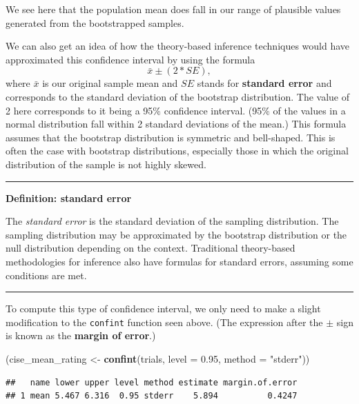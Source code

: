 \documentclass[]{tufte-book}
\newenvironment{Shaded}{\begin{snugshade}}{\end{snugshade}}
\newcommand{\KeywordTok}[1]{\textcolor[rgb]{0.13,0.29,0.53}{\textbf{{#1}}}}
\newcommand{\DataTypeTok}[1]{\textcolor[rgb]{0.13,0.29,0.53}{{#1}}}
\newcommand{\FloatTok}[1]{\textcolor[rgb]{0.00,0.00,0.81}{{#1}}}
\newcommand{\StringTok}[1]{\textcolor[rgb]{0.31,0.60,0.02}{{#1}}}
\newcommand{\NormalTok}[1]{{#1}}
\let\oldrule=\rule
\renewcommand{\rule}[1]{\oldrule{\linewidth}}
\begin{document}
We see here that the population mean does fall in our range of plausible
values generated from the bootstrapped samples.

We can also get an idea of how the theory-based inference techniques
would have approximated this confidence interval by using the formula
\[\bar{x} \pm (2 * SE),\] where \(\bar{x}\) is our original sample mean
and \(SE\) stands for \textbf{standard error} and corresponds to the
standard deviation of the bootstrap distribution. The value of 2 here
corresponds to it being a 95\% confidence interval. (95\% of the values
in a normal distribution fall within 2 standard deviations of the mean.)
This formula assumes that the bootstrap distribution is symmetric and
bell-shaped. This is often the case with bootstrap distributions,
especially those in which the original distribution of the sample is not
highly skewed.

\begin{center}\rule{0.5\linewidth}{\linethickness}\end{center}

\textbf{Definition: standard error}

The \emph{standard error} is the standard deviation of the sampling
distribution. The sampling distribution may be approximated by the
bootstrap distribution or the null distribution depending on the
context. Traditional theory-based methodologies for inference also have
formulas for standard errors, assuming some conditions are met.

\begin{center}\rule{0.5\linewidth}{\linethickness}\end{center}

To compute this type of confidence interval, we only need to make a
slight modification to the \texttt{confint} function seen above. (The
expression after the \(\pm\) sign is known as the \textbf{margin of
error}.)

\begin{Shaded}
\begin{Highlighting}[]
\NormalTok{(cise_mean_rating <-}\StringTok{ }\KeywordTok{confint}\NormalTok{(trials, }\DataTypeTok{level =} \FloatTok{0.95}\NormalTok{, }\DataTypeTok{method =} \StringTok{"stderr"}\NormalTok{))}
\end{Highlighting}
\end{Shaded}

\begin{verbatim}
##   name lower upper level method estimate margin.of.error
## 1 mean 5.467 6.316  0.95 stderr    5.894          0.4247
\end{verbatim}
\end{document}
